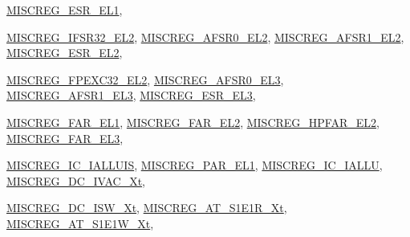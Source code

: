 \begin{DoxyCompactItemize}
\hyperlink{namespaceArmISA_a1e522017e015d4c7efd6b2360143aa67a0564746838caa8f18fea94f896c4c62e}{MISCREG\_\-ESR\_\-EL1}, 
\par
\hyperlink{namespaceArmISA_a1e522017e015d4c7efd6b2360143aa67aa95c9a23933ba6047393407e4b64437e}{MISCREG\_\-IFSR32\_\-EL2}, 
\hyperlink{namespaceArmISA_a1e522017e015d4c7efd6b2360143aa67a14a7d306bffda583a810b1ec788726cc}{MISCREG\_\-AFSR0\_\-EL2}, 
\hyperlink{namespaceArmISA_a1e522017e015d4c7efd6b2360143aa67afb0cb0423920e911012dcb75f9aee606}{MISCREG\_\-AFSR1\_\-EL2}, 
\hyperlink{namespaceArmISA_a1e522017e015d4c7efd6b2360143aa67adb28067c2dcca816b56353aba4bd83d3}{MISCREG\_\-ESR\_\-EL2}, 
\par
\hyperlink{namespaceArmISA_a1e522017e015d4c7efd6b2360143aa67a8cc06fadde944bb26a5e91f7eb289fad}{MISCREG\_\-FPEXC32\_\-EL2}, 
\hyperlink{namespaceArmISA_a1e522017e015d4c7efd6b2360143aa67a578fd93e29bf140beb47442e3a3bd8a1}{MISCREG\_\-AFSR0\_\-EL3}, 
\hyperlink{namespaceArmISA_a1e522017e015d4c7efd6b2360143aa67ac79ca6c230f2fed135bd2126684c4785}{MISCREG\_\-AFSR1\_\-EL3}, 
\hyperlink{namespaceArmISA_a1e522017e015d4c7efd6b2360143aa67ae69a63891943518fa7b35fbcf5931e6a}{MISCREG\_\-ESR\_\-EL3}, 
\par
\hyperlink{namespaceArmISA_a1e522017e015d4c7efd6b2360143aa67aace41c4a985a000b25792e42b953e78c}{MISCREG\_\-FAR\_\-EL1}, 
\hyperlink{namespaceArmISA_a1e522017e015d4c7efd6b2360143aa67a13b3e89ec94f66fd9b2eb5d5004c41c0}{MISCREG\_\-FAR\_\-EL2}, 
\hyperlink{namespaceArmISA_a1e522017e015d4c7efd6b2360143aa67aace88b1420a7ba815ba7aeb9da7d6ad1}{MISCREG\_\-HPFAR\_\-EL2}, 
\hyperlink{namespaceArmISA_a1e522017e015d4c7efd6b2360143aa67a505f452313699951c33d1624216e4a5b}{MISCREG\_\-FAR\_\-EL3}, 
\par
\hyperlink{namespaceArmISA_a1e522017e015d4c7efd6b2360143aa67a83a73098a84d37f44eecfc49aecc59ea}{MISCREG\_\-IC\_\-IALLUIS}, 
\hyperlink{namespaceArmISA_a1e522017e015d4c7efd6b2360143aa67ad63884747a1d1c4737e45b83ef93391b}{MISCREG\_\-PAR\_\-EL1}, 
\hyperlink{namespaceArmISA_a1e522017e015d4c7efd6b2360143aa67ad09cda95a141ac26e03d5d937cbaf24b}{MISCREG\_\-IC\_\-IALLU}, 
\hyperlink{namespaceArmISA_a1e522017e015d4c7efd6b2360143aa67aa1e028c07ee1f677aa0fdbf179139b48}{MISCREG\_\-DC\_\-IVAC\_\-Xt}, 
\par
\hyperlink{namespaceArmISA_a1e522017e015d4c7efd6b2360143aa67ad5c5b20a4d5955171cd8a9834b649b2b}{MISCREG\_\-DC\_\-ISW\_\-Xt}, 
\hyperlink{namespaceArmISA_a1e522017e015d4c7efd6b2360143aa67ac813daf1b8f35ff7d2f0d9b9ed451430}{MISCREG\_\-AT\_\-S1E1R\_\-Xt}, 
\hyperlink{namespaceArmISA_a1e522017e015d4c7efd6b2360143aa67a54827501a5c3162118bdd43b901d23c8}{MISCREG\_\-AT\_\-S1E1W\_\-Xt}, 

\end{DoxyCompactItemize}
